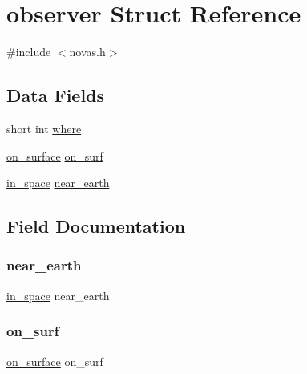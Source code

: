\hypertarget{structobserver}{}\section{observer Struct Reference}
\label{structobserver}


{\ttfamily \#include $<$novas.\+h$>$}

\subsection*{Data Fields}
\begin{DoxyCompactItemize}
\item 
short int \mbox{\hyperlink{structobserver_a62444ffa161301201c9ed5b4a5deee4b}{where}}
\item 
\mbox{\hyperlink{structon__surface}{on\+\_\+surface}} \mbox{\hyperlink{structobserver_a0ed422bd2a08c6b3870b545e16484501}{on\+\_\+surf}}
\item 
\mbox{\hyperlink{structin__space}{in\+\_\+space}} \mbox{\hyperlink{structobserver_a447c33455c0da962abf8621638c994b5}{near\+\_\+earth}}
\end{DoxyCompactItemize}


\subsection{Field Documentation}
\mbox{\label{structobserver_a447c33455c0da962abf8621638c994b5}} 
\subsubsection{\texorpdfstring{near\+\_\+earth}{near\_earth}}
{\footnotesize\ttfamily \mbox{\hyperlink{structin__space}{in\+\_\+space}} near\+\_\+earth}

\mbox{\label{structobserver_a0ed422bd2a08c6b3870b545e16484501}} 
\subsubsection{\texorpdfstring{on\+\_\+surf}{on\_surf}}
{\footnotesize\ttfamily \mbox{\hyperlink{structon__surface}{on\+\_\+surface}} on\+\_\+surf}

